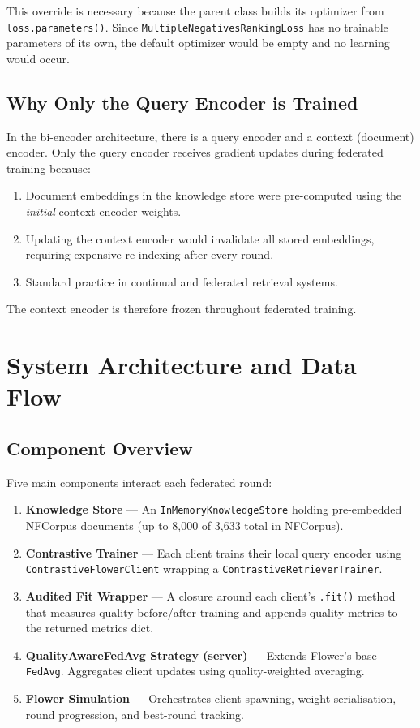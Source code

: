 \documentclass[12pt,a4paper]{article}
\begin{document}
This override is necessary because the parent class builds its optimizer from \texttt{loss.parameters()}. Since \texttt{MultipleNegativesRankingLoss} has no trainable parameters of its own, the default optimizer would be empty and no learning would occur.

\subsection{Why Only the Query Encoder is Trained}

In the bi-encoder architecture, there is a query encoder and a context (document) encoder. Only the query encoder receives gradient updates during federated training because:
\begin{enumerate}
  \item Document embeddings in the knowledge store were pre-computed using the \textit{initial} context encoder weights.
  \item Updating the context encoder would invalidate all stored embeddings, requiring expensive re-indexing after every round.
  \item Standard practice in continual and federated retrieval systems.
\end{enumerate}

The context encoder is therefore frozen throughout federated training.

\section{System Architecture and Data Flow}

\subsection{Component Overview}

Five main components interact each federated round:

\begin{enumerate}
  \item \textbf{Knowledge Store} --- An \texttt{InMemoryKnowledgeStore} holding pre-embedded NFCorpus documents (up to 8,000 of 3,633 total in NFCorpus).
  \item \textbf{Contrastive Trainer} --- Each client trains their local query encoder using \texttt{ContrastiveFlowerClient} wrapping a \texttt{ContrastiveRetrieverTrainer}.
  \item \textbf{Audited Fit Wrapper} --- A closure around each client's \texttt{.fit()} method that measures quality before/after training and appends quality metrics to the returned metrics dict.
  \item \textbf{QualityAwareFedAvg Strategy (server)} --- Extends Flower's base \texttt{FedAvg}. Aggregates client updates using quality-weighted averaging.
  \item \textbf{Flower Simulation} --- Orchestrates client spawning, weight serialisation, round progression, and best-round tracking.
\end{enumerate}
\end{document}
